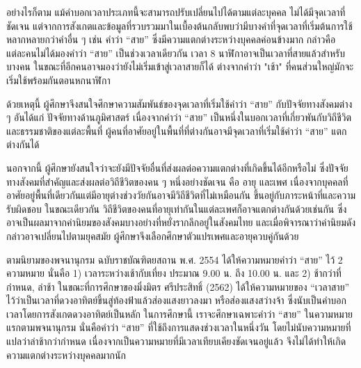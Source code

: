 \documentclass[a4paper]{article}
\begin{document}
    อย่างไรก็ตาม แม้คำบอกเวลาประเภทนี้จะสามารถปรับเปลี่ยนไปได้ตามแต่ละบุคคล ไม่ได้มีจุดเวลาที่ชัดเจน แต่จากการสังเกตและข้อมูลที่รวบรวมมาในเบื้องต้นกลับพบว่ามีบางคำที่จุดเวลาที่เริ่มต้นการใช้หลากหลายกว่าคำอื่น ๆ เช่น คำว่า “สาย” ซึ่งมีความแตกต่างระหว่างบุคคลค่อนข้างมาก กล่าวคือ แต่ละคนไม่ได้มองคำว่า “สาย” เป็นช่วงเวลาเดียวกัน เวลา 8 นาฬิกาอาจเป็นเวลาที่สายแล้วสำหรับบางคน ในขณะที่อีกคนอาจมองว่ายังไม่เริ่มเข้าสู่เวลาสายก็ได้ ต่างจากคำว่า "เช้า" ที่คนส่วนใหญ่มักจะเริ่มใช้พร้อมกันตอนหกนาฬิกา

    ด้วยเหตุนี้ ผู้ศึกษาจึงสนใจศึกษาความสัมพันธ์ของจุดเวลาที่เริ่มใช้คำว่า “สาย” กับปัจจัยทางสังคมต่าง ๆ อันได้แก่ ปัจจัยทางด้านภูมิศาสตร์ เนื่องจากคำว่า “สาย” เป็นหนึ่งในบอกเวลาที่เกี่ยวพันกับวิถีชีวิตและธรรมชาติของแต่ละพื้นที่ ผู้คนที่อาศัยอยู่ในพื้นที่ที่ต่างกันอาจมีจุดเวลาที่เริ่มใช้คำว่า “สาย” แตกต่างกันได้

    นอกจากนี้ ผู้ศึกษายังสนใจว่าจะยังมีปัจจัยอื่นที่ส่งผลต่อความแตกต่างที่เกิดขึ้นได้อีกหรือไม่ ซึ่งปัจจัยทางสังคมที่สำคัญและส่งผลต่อวิถีชีวิตของคน ๆ หนึ่งอย่างชัดเจน คือ อายุ และเพศ เนื่องจากบุคคลที่อาศัยอยู่พื้นที่เดียวกันแต่มีอายุต่างช่วงวัยกันอาจมีวิถีชีวิตที่ไม่เหมือนกัน ขึ้นอยู่กับภาระหน้าที่และความรับผิดชอบ ในขณะเดียวกัน วิถีชีวิตของคนที่อายุเท่ากันในแต่ละเพศก็อาจแตกต่างกันด้วยเช่นกัน ซึ่งอาจเป็นผลมาจากค่านิยมของสังคมบางอย่างที่หยั่งรากลึกอยู่ในสังคมไทย และเมื่อพิจารณาว่าค่านิยมดังกล่าวอาจเปลี่ยนไปตามยุคสมัย ผู้ศึกษาจึงเลือกศึกษาตัวแปรเพศและอายุควบคู่กันด้วย

    ตามนิยามของพจนานุกรม ฉบับราชบัณฑิตยสถาน พ.ศ. 2554 ได้ให้ความหมายคำว่า “สาย” ไว้ 2 ความหมาย นั่นคือ 1) เวลาระหว่างเช้ากับเที่ยง ประมาณ 9.00 น. ถึง 10.00 น. และ 2) ช้ากว่าที่กำหนด, ล่าช้า ในขณะที่การศึกษาของมิ่งมิตร ศรีประสิทธิ์ (2562) ได้ให้ความหมายของ “เวลาสาย” ไว้ว่าเป็นเวลาที่ดวงอาทิตย์ขึ้นสู่ท้องฟ้าแล้วส่องแสงยาวลงมา หรือส่องแสงสว่างจ้า ซึ่งนับเป็นคำบอกเวลาโดยการสังเกตดวงอาทิตย์เป็นหลัก ในการศึกษานี้ เราจะศึกษาเฉพาะคำว่า “สาย” ในความหมายแรกตามพจนานุกรม นั่นคือคำว่า “สาย” ที่ใช้ถึงการแสดงช่วงเวลาในหนึ่งวัน โดยไม่นับความหมายที่แปลว่าล่าช้ากว่ากำหนด เนื่องจากเป็นความหมายที่มีเวลาเทียบเคียงชัดเจนอยู่แล้ว จึงไม่ได้ทำให้เกิดความแตกต่างระหว่างบุคคลมากนัก
\end{document}
